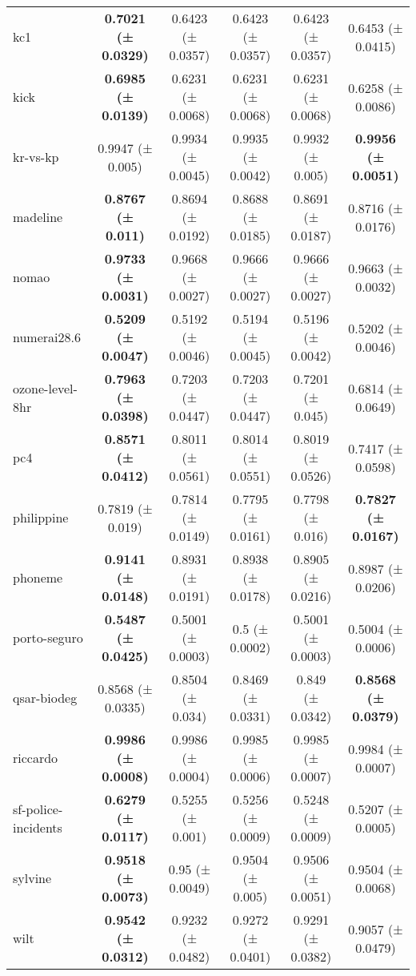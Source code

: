 \documentclass[11pt]{article}
\begin{document}
\begin{table}[h]
{\begin{tabular}{@{}lccccc@{}}
kc1                    & \textbf{0.7021 (± 0.0329)} & 0.6423 (± 0.0357)          & 0.6423 (± 0.0357) & 0.6423 (± 0.0357) & 0.6453 (± 0.0415)          \\
kick                   & \textbf{0.6985 (± 0.0139)} & 0.6231 (± 0.0068)          & 0.6231 (± 0.0068) & 0.6231 (± 0.0068) & 0.6258 (± 0.0086)          \\
kr-vs-kp               & 0.9947 (± 0.005)           & 0.9934 (± 0.0045)          & 0.9935 (± 0.0042) & 0.9932 (± 0.005)  & \textbf{0.9956 (± 0.0051)} \\
madeline               & \textbf{0.8767 (± 0.011)}  & 0.8694 (± 0.0192)          & 0.8688 (± 0.0185) & 0.8691 (± 0.0187) & 0.8716 (± 0.0176)          \\
nomao                  & \textbf{0.9733 (± 0.0031)} & 0.9668 (± 0.0027)          & 0.9666 (± 0.0027) & 0.9666 (± 0.0027) & 0.9663 (± 0.0032)          \\
numerai28.6            & \textbf{0.5209 (± 0.0047)} & 0.5192 (± 0.0046)          & 0.5194 (± 0.0045) & 0.5196 (± 0.0042) & 0.5202 (± 0.0046)          \\
ozone-level-8hr        & \textbf{0.7963 (± 0.0398)} & 0.7203 (± 0.0447)          & 0.7203 (± 0.0447) & 0.7201 (± 0.045)  & 0.6814 (± 0.0649)          \\
pc4                    & \textbf{0.8571 (± 0.0412)} & 0.8011 (± 0.0561)          & 0.8014 (± 0.0551) & 0.8019 (± 0.0526) & 0.7417 (± 0.0598)          \\
philippine             & 0.7819 (± 0.019)           & 0.7814 (± 0.0149)          & 0.7795 (± 0.0161) & 0.7798 (± 0.016)  & \textbf{0.7827 (± 0.0167)} \\
phoneme                & \textbf{0.9141 (± 0.0148)} & 0.8931 (± 0.0191)          & 0.8938 (± 0.0178) & 0.8905 (± 0.0216) & 0.8987 (± 0.0206)          \\
porto-seguro           & \textbf{0.5487 (± 0.0425)} & 0.5001 (± 0.0003)          & 0.5 (± 0.0002)    & 0.5001 (± 0.0003) & 0.5004 (± 0.0006)          \\
qsar-biodeg            & 0.8568 (± 0.0335)          & 0.8504 (± 0.034)           & 0.8469 (± 0.0331) & 0.849 (± 0.0342)  & \textbf{0.8568 (± 0.0379)} \\
riccardo               & \textbf{0.9986 (± 0.0008)} & 0.9986 (± 0.0004)          & 0.9985 (± 0.0006) & 0.9985 (± 0.0007) & 0.9984 (± 0.0007)          \\
sf-police-incidents    & \textbf{0.6279 (± 0.0117)} & 0.5255 (± 0.001)           & 0.5256 (± 0.0009) & 0.5248 (± 0.0009) & 0.5207 (± 0.0005)          \\
sylvine                & \textbf{0.9518 (± 0.0073)} & 0.95 (± 0.0049)            & 0.9504 (± 0.005)  & 0.9506 (± 0.0051) & 0.9504 (± 0.0068)          \\
wilt                   & \textbf{0.9542 (± 0.0312)} & 0.9232 (± 0.0482)          & 0.9272 (± 0.0401) & 0.9291 (± 0.0382) & 0.9057 (± 0.0479)          \\ \bottomrule
\end{tabular}%
}
\end{table}
\end{document}
